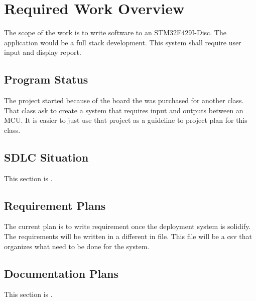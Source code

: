 
\chapter{Required Work Overview}
\label{loc:RequiredWorkOverview}
% 

The scope of the work is to write software to an STM32F429I-Disc. The application would be a full stack development. This system shall require user input and display report.

\section{Program Status}
\label{loc:RWO_ProgramStatus}
% 

The project started because of the board the was purchased for another class. That class ask to create a system that requires input and outputs between an MCU.
It is easier to just use that project as a guideline to project plan for this class.


\section{SDLC Situation}
\label{loc:RWO_SDLC}
% 

This section is \TBD.


\section{Requirement Plans}
\label{loc:RWO_RequirementPlans}
% 

The current plan is to write requirement once the deployment system is solidify. The requirements will be written in a different in file. 
This file will be a csv that organizes what need to be done for the system.


\section{Documentation Plans}
\label{loc:RWO_DocumentationPlans}
% 

This section is \TBD.

